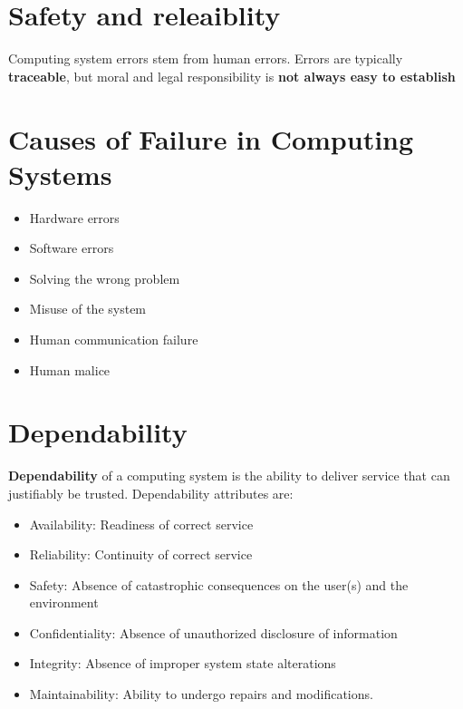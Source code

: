 \documentclass{article}
\begin{document}
\tableofcontents

\newpage

\section{Safety and releaiblity}

\begin{flushleft}
Computing system errors stem from human errors. Errors are typically \textbf{traceable}, but moral and legal responsibility is \textbf{not always easy to establish}
\end{flushleft}

\section{Causes of Failure in Computing Systems}

\begin{itemize}
  \item Hardware errors 
  \item Software errors 
  \item Solving the wrong problem 
  \item Misuse of the system 
  \item Human communication failure 
  \item Human malice
\end{itemize}

\section{Dependability}

\begin{flushleft}
\textbf{Dependability} of a computing system is the ability to deliver service that can justifiably be trusted. Dependability attributes are:
\begin{itemize}
  \item Availability: Readiness of correct service 
  \item Reliability: Continuity of correct service 
  \item Safety: Absence of catastrophic consequences on the user(s) and the environment 
  \item Confidentiality: Absence of unauthorized disclosure of information 
  \item Integrity: Absence of improper system state alterations 
  \item Maintainability: Ability to undergo repairs and modifications.
\end{itemize}
\end{flushleft}
\end{document}
